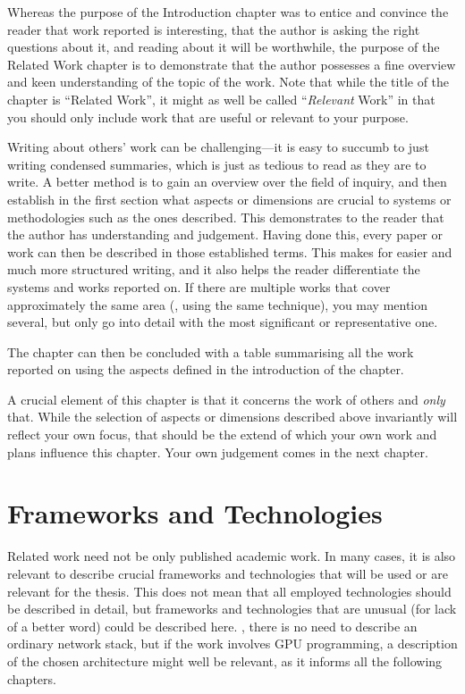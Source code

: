 \documentclass[ twoside,openright,titlepage,numbers=noenddot,headinclude,%
                footinclude=true,cleardoublepage=empty,abstractoff, %
                BCOR=5mm,paper=a4,fontsize=11pt,%
                ngerman,american,%
                ]{scrreprt}
\begin{document}
Whereas the purpose of the Introduction chapter was to entice and
convince the reader that work reported is interesting, that the author
is asking the right questions about it, and reading about it will be
worthwhile, the purpose of the Related Work chapter is to
demonstrate that the author possesses a fine overview and keen
understanding of the topic of the work.  Note that while the title of
the chapter is ``Related Work'', it might as well be called
``\emph{Relevant} Work'' in that you should only include work that are
useful or relevant to your purpose. 

Writing about others' work can be challenging---it is easy to succumb
to just writing condensed summaries, which is just as tedious to read
as they are to write. A better method is to gain an overview over the
field of inquiry, and then establish in the first section what aspects
or dimensions are crucial to systems or methodologies such as the ones
described. This demonstrates to the reader that the author has
understanding and judgement. Having done this, every paper or work can
then be described in those established terms. This makes for easier
and much more structured writing, and it also helps the reader
differentiate the systems and works reported on. If there are multiple
works that cover approximately the same area (\eg, using the same
technique), you may mention several, but only go into detail with the
most significant or representative one.

The chapter can then be concluded with a table summarising all the
work reported on using the aspects defined in the introduction of the
chapter.

A crucial element of this chapter is that it concerns the work of
others and \emph{only} that. While the selection of aspects or
dimensions described above invariantly will reflect your own focus,
that should be the extend of which your own work and plans influence
this chapter.  Your own judgement comes in the next chapter.

\section{Frameworks and Technologies}
\label{sec:fram-techn}

Related work need not be only published academic work. In many cases,
it is also relevant to describe crucial frameworks and technologies
that will be used or are relevant for the thesis.  This does not mean
that all employed technologies should be described in detail, but
frameworks and technologies that are unusual (for lack of a better
word) could be described here. \Eg, there is no need to describe an
ordinary network stack, but if the work involves GPU programming, a
description of the chosen architecture might well be relevant, as it
informs all the following chapters.
\end{document}
